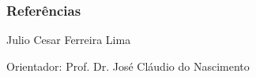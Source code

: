 \documentclass{libs/ufc_format}
\begin{document}
\begin{frame}[allowframebreaks]
    \frametitle{Referências}
    \printbibliography
\end{frame}

\begin{frame}{}
    \centering
    \huge{\textbf{}}
    
    \vspace{1cm}
    
    \normalsize{Julio Cesar Ferreira Lima}
    
    \small{}
    
    \vspace{0.5cm}
    
    \small{Orientador: Prof. Dr. José Cláudio do Nascimento}
\end{frame}
\end{document}
